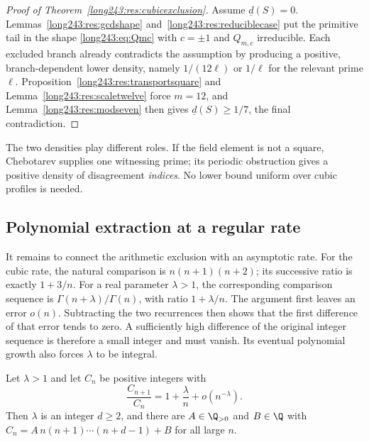 \begin{proof}[Proof of Theorem~\ref{long243:res:cubicexclusion}]
Assume $\underline d(S)=0$.  Lemmas~\ref{long243:res:gcdshape}
and~\ref{long243:res:reduciblecase} put the primitive tail in the shape \eqref{long243:eq:Qmc}
with $c=\pm1$ and $Q_{m,c}$ irreducible.  Each excluded branch already
contradicts the assumption by producing a positive, branch-dependent lower
density, namely $1/(12\ell)$ or $1/\ell$ for the relevant prime $\ell$.
Proposition~\ref{long243:res:transportsquare} and Lemma~\ref{long243:res:scaletwelve} force
$m=12$, and Lemma~\ref{long243:res:modseven} then gives
$\underline d(S)\ge1/7$, the final contradiction.
\end{proof}

The two densities play different roles. If the field element is not
a square, Chebotarev supplies one witnessing prime; its periodic
obstruction gives a positive density of disagreement \emph{indices}.
No lower bound uniform over cubic profiles is needed.

\subsection{Polynomial extraction at a regular rate}

It remains to connect the arithmetic exclusion with an asymptotic
rate. For the cubic rate, the natural comparison is $n(n+1)(n+2)$;
its successive ratio is exactly $1+3/n$. For a real parameter
$\lambda>1$, the corresponding comparison sequence is
$\Gamma(n+\lambda)/\Gamma(n)$, with ratio $1+\lambda/n$.
The argument first leaves an error $o(n)$. Subtracting the two
recurrences then shows that the first difference of that error tends
to zero. A sufficiently high difference of the original integer
sequence is therefore a small integer and must vanish. Its eventual
polynomial growth also forces $\lambda$ to be integral.

\begin{lemma}\label{long243:res:extraction}
Let $\lambda>1$ and let $C_n$ be positive integers with
\begin{equation}\label{long243:eq:regularrate}
 \frac{C_{n+1}}{C_n}=1+\frac\lambda n+o(n^{-\lambda}).
\end{equation}
Then $\lambda$ is an integer $d\ge2$, and there are $A\in\Q_{>0}$ and
$B\in\Q$ with $C_n=A\,n(n+1)\cdots(n+d-1)+B$ for all large $n$.
\end{lemma}

